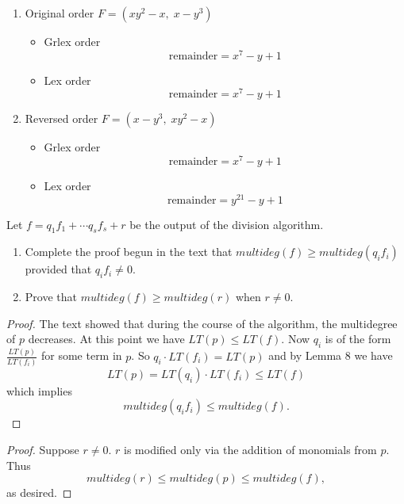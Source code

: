 \begin{enumerate}
    \item Original order $F = (xy^2 - x,\; x - y^3)$
    \begin{itemize}
        \item Grlex order
        \[
        \text{remainder} = x^7 - y + 1
        \]
        \item Lex order 
        \[
        \text{remainder} = x^7 - y + 1
        \]
    \end{itemize}

    \item Reversed order $F = (x - y^3,\; xy^2 - x)$
    \begin{itemize}
        \item Grlex order
        \[
        \text{remainder} = x^7 - y + 1
        \]
        \item Lex order
        \[
        \text{remainder} = y^{21} - y + 1
        \]
    \end{itemize}
\end{enumerate}

\begin{tcolorbox}[title=Problem 4, breakable]
    Let $f = q_1 f_1 + \cdots q_s f_s + r$ be the output of the division algorithm.
    \begin{enumerate}
        \item Complete the proof begun in the text that $multideg(f) \ge multideg(q_i f_i)$
        provided that $q_i f_i \ne 0$.
        \item Prove that $multideg(f) \ge multideg(r)$ when $r \ne 0$.
    \end{enumerate}
\end{tcolorbox}

\begin{proof}
    The text showed that during the course of the algorithm,
        the multidegree of $p$ decreases.
    At this point we have $LT(p) \le LT(f)$.
    Now $q_i$ is of the form $\frac{LT(p)}{LT(f_i)}$ for some term in $p$.
    So $q_i \cdot LT(f_i) = LT(p)$ and by Lemma 8 we have 
    \[
        LT(p) = LT(q_i) \cdot LT(f_i) \le LT(f)
    \]
    which implies
    \[
        multideg(q_i f_i) \le multideg(f).
    \]
\end{proof}

\begin{proof}
    Suppose $r \ne 0$.
    $r$ is modified only via the addition of monomials from $p$.
    Thus
    \[
        multideg(r) \le multideg(p) \le multideg(f),
    \]
    as desired.
\end{proof}

